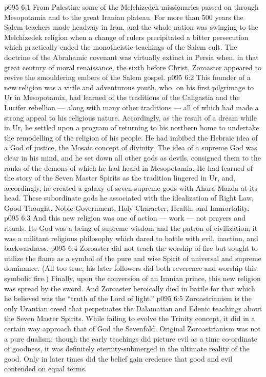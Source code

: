 \vs p095 6:1 From Palestine some of the Melchizedek missionaries passed on through Mesopotamia and to the great Iranian plateau. For more than 500 years the Salem teachers made headway in Iran, and the whole nation was swinging to the Melchizedek religion when a change of rulers precipitated a bitter persecution which practically ended the monotheistic teachings of the Salem cult. The doctrine of the Abrahamic covenant was virtually extinct in Persia when, in that great century of moral renaissance, the sixth before Christ, Zoroaster appeared to revive the smouldering embers of the Salem gospel.
\vs p095 6:2 This founder of a new religion was a virile and adventurous youth, who, on his first pilgrimage to Ur in Mesopotamia, had learned of the traditions of the Caligastia and the Lucifer rebellion --- along with many other traditions --- all of which had made a strong appeal to his religious nature. Accordingly, as the result of a dream while in Ur, he settled upon a program of returning to his northern home to undertake the remodelling of the religion of his people. He had imbibed the Hebraic idea of a God of justice, the Mosaic concept of divinity. The idea of a supreme God was clear in his mind, and he set down all other gods as devils, consigned them to the ranks of the demons of which he had heard in Mesopotamia. He had learned of the story of the Seven Master Spirits as the tradition lingered in Ur, and, accordingly, he created a galaxy of seven supreme gods with Ahura\hyp{}Mazda at its head. These subordinate gods he associated with the idealization of Right Law, Good Thought, Noble Government, Holy Character, Health, and Immortality.
\vs p095 6:3 And this new religion was one of action --- work --- not prayers and rituals. Its God was a being of supreme wisdom and the patron of civilization; it was a militant religious philosophy which dared to battle with evil, inaction, and backwardness.
\vs p095 6:4 Zoroaster did not teach the worship of fire but sought to utilize the flame as a symbol of the pure and wise Spirit of universal and supreme dominance. (All too true, his later followers did both reverence and worship this symbolic fire.) Finally, upon the conversion of an Iranian prince, this new religion was spread by the sword. And Zoroaster heroically died in battle for that which he believed was the “truth of the Lord of light.”
\vs p095 6:5 \pc Zoroastrianism is the only Urantian creed that perpetuates the Dalamatian and Edenic teachings about the Seven Master Spirits. While failing to evolve the Trinity concept, it did in a certain way approach that of God the Sevenfold. Original Zoroastrianism was not a pure dualism; though the early teachings did picture evil as a time co\hyp{}ordinate of goodness, it was definitely eternity\hyp{}submerged in the ultimate reality of the good. Only in later times did the belief gain credence that good and evil contended on equal terms.
